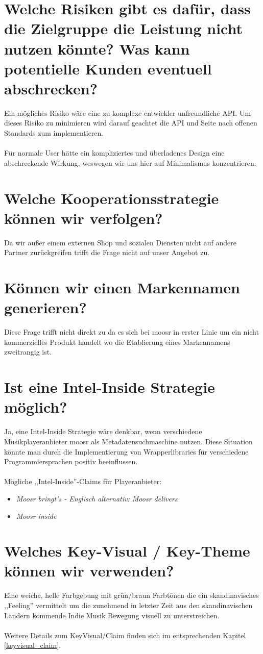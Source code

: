 \section{Welche Risiken gibt es dafür, dass die Zielgruppe die Leistung nicht nutzen könnte? Was kann potentielle Kunden eventuell abschrecken?}
Ein mögliches Risiko wäre eine zu komplexe entwickler-unfreundliche API. Um
dieses Risiko zu minimieren wird darauf geachtet die API und Seite nach offenen
Standards zum implementieren.
\\
\\
Für normale User hätte ein kompliziertes und überladenes Design eine
abschreckende Wirkung, weswegen wir uns hier auf Minimalismus konzentrieren.

\section{Welche Kooperationsstrategie können wir verfolgen?}
Da wir außer einem externen Shop und sozialen Diensten nicht auf andere Partner
zurückgreifen trifft die Frage nicht auf unser Angebot zu.

\section{Können wir einen Markennamen generieren?}
Diese Frage trifft nicht direkt zu da es sich bei moosr in erster Linie um ein
nicht kommerzielles Produkt handelt wo die Etablierung eines Markennamens
zweitrangig ist. 

\section{Ist eine Intel-Inside Strategie möglich?}
Ja, eine Intel-Inside Strategie wäre denkbar, wenn verschiedene Musikplayeranbieter
moosr als Metadatensuchmaschine nutzen. Diese Situation könnte man durch die
Implementierung von Wrapperlibraries für verschiedene Programmiersprachen
positiv beeinflussen.
\\
\\
Mögliche ,,Intel-Inside''-Claims für Playeranbieter:
\begin{itemize}
    \item \it{Moosr bringt's} - Englisch alternativ: \it{Moosr delivers}
    \item \it{Moosr inside}
\end{itemize}

\section{Welches Key-Visual / Key-Theme können wir verwenden?}
Eine weiche, helle Farbgebung mit grün/braun Farbtönen die ein skandinavisches
,,Feeling'' vermittelt um die zunehmend in letzter Zeit aus den skandinavischen
Ländern kommende Indie Musik Bewegung visuell zu  unterstreichen.
\\
\\
Weitere Details zum KeyVisual/Claim finden sich im entsprechenden Kapitel
\ref{keyvisual_claim}.

